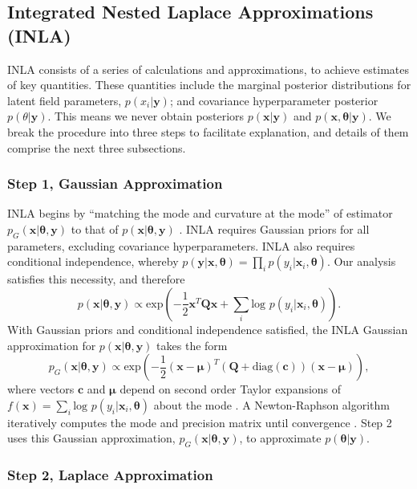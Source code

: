 \subsection{Integrated Nested Laplace Approximations (INLA)}

INLA consists of a series of calculations and approximations, to achieve estimates of key quantities. These quantities include the marginal posterior distributions for latent field parameters, $p(x_{i}|\pmb{y})$; and covariance hyperparameter posterior $p(\theta|\pmb{y})$. This means we never obtain posteriors $p(\pmb{x}|\pmb{y})$ and $p(\pmb{x},\pmb{\theta}|\pmb{y})$. We break the procedure into three steps to facilitate explanation, and details of them comprise the next three subsections.

\subsubsection{Step 1, Gaussian Approximation} %

INLA begins by ``matching the mode and curvature at the mode'' of estimator $p_{G}(\pmb{x}|\pmb{\theta}, \pmb{y})$ to that of $p(\pmb{x}|\pmb{\theta}, \pmb{y})$ \citep{Rue2005}. INLA requires Gaussian priors for all parameters, excluding covariance hyperparameters. INLA also requires conditional independence, whereby $p(\pmb{y}|\pmb{x}, \pmb{\theta}) = \prod_{i} p(y_{i}|\pmb{x}_{i},\pmb{\theta})$. Our analysis satisfies this necessity, and therefore $$p(\pmb{x}|\pmb{\theta},\pmb{y}) \propto \text{exp}\left(-\frac{1}{2}\pmb{x}^{T}\pmb{Q x} + \sum_{i} \text{log }p(y_{i}|\pmb{x}_{i},\pmb{\theta}) \right).$$ With Gaussian priors and conditional independence satisfied, the INLA Gaussian approximation for $p(\pmb{x}|\pmb{\theta}, \pmb{y})$ takes the form
$$p_{G}(\pmb{x}|\pmb{\theta},\pmb{y}) \propto \text{exp} \left( -\frac{1}{2}(\pmb{x-\mu})^{T} (\pmb{Q} + \text{diag}(\pmb{c}) ) (\pmb{x - \mu}) \right),$$
where vectors $\pmb{c}$ and $\pmb{\mu}$ depend on second order Taylor expansions of $f(\pmb{x}) = \sum_{i} \text{log }p(y_{i}|\pmb{x}_{i},\pmb{\theta})$ about the mode \citep{Lindstrom2014}. A Newton-Raphson algorithm iteratively computes the mode and precision matrix until convergence \citep{Rue2009}. Step 2 uses this Gaussian approximation, $p_{G}(\pmb{x}|\pmb{\theta},\pmb{y})$, to approximate $p(\pmb{\theta}|\pmb{y})$.

\subsubsection{Step 2, Laplace Approximation}  %

